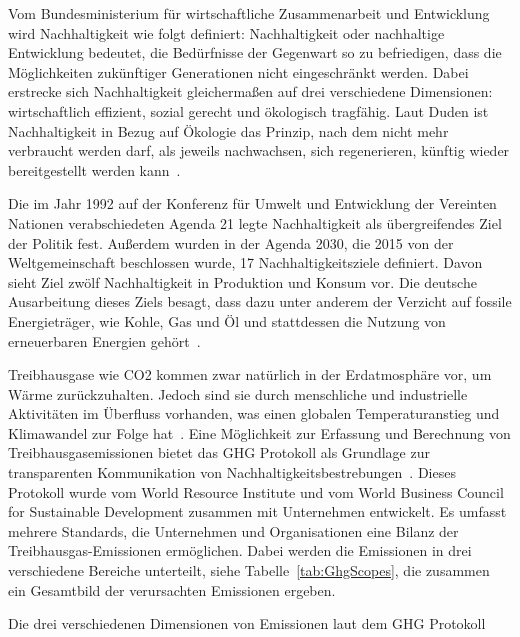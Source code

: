 Vom Bundesministerium für wirtschaftliche Zusammenarbeit und Entwicklung~\cite{BundesministeriumWirtschaftlicheZusammenarbeitundEntwicklung} wird Nachhaltigkeit wie folgt definiert:
\glqq Nachhaltigkeit oder nachhaltige Entwicklung bedeutet, die Bedürfnisse der Gegenwart so zu befriedigen, dass die Möglichkeiten zukünftiger Generationen nicht eingeschränkt werden.\grqq{}
Dabei erstrecke sich Nachhaltigkeit gleichermaßen auf drei verschiedene Dimensionen: wirtschaftlich effizient, sozial gerecht und ökologisch tragfähig.
Laut Duden ist Nachhaltigkeit in Bezug auf Ökologie das \glqq Prinzip, nach dem nicht mehr verbraucht werden darf, als jeweils nachwachsen, sich regenerieren, künftig wieder bereitgestellt werden kann\grqq{}~\cite{Dudenredaktion.27.04.2018}.

Die im Jahr 1992 auf der Konferenz für Umwelt und Entwicklung der Vereinten Nationen verabschiedeten Agenda 21 legte Nachhaltigkeit als übergreifendes Ziel der Politik fest.
Außerdem wurden in der Agenda 2030, die 2015 von der Weltgemeinschaft beschlossen wurde, 17 Nachhaltigkeitsziele definiert.
Davon sieht Ziel zwölf Nachhaltigkeit in Produktion und Konsum vor.
Die deutsche Ausarbeitung dieses Ziels besagt, dass dazu unter anderem der Verzicht auf fossile Energieträger, wie Kohle, Gas und Öl und stattdessen die Nutzung von erneuerbaren Energien gehört~\cite{Bundesregierunginformiert}.

Treibhausgase wie \ac{CO2} kommen zwar natürlich in der Erdatmosphäre vor, um Wärme zurückzuhalten.
Jedoch sind sie durch menschliche und industrielle Aktivitäten im Überfluss vorhanden, was einen globalen Temperaturanstieg und Klimawandel zur Folge hat~\cite{Currie.2024}.
Eine Möglichkeit zur Erfassung und Berechnung von Treibhausgasemissionen bietet das \ac{GHG} Protokoll als Grundlage zur transparenten Kommunikation von Nachhaltigkeitsbestrebungen~\cite{WorldBusinessCouncilforSustainableDevelopment.2004}.
Dieses Protokoll wurde vom World Resource Institute und vom World Business Council for Sustainable Development zusammen mit Unternehmen entwickelt.
Es umfasst mehrere Standards, die Unternehmen und Organisationen eine Bilanz der Treibhausgas-Emissionen ermöglichen.
Dabei werden die Emissionen in drei verschiedene Bereiche unterteilt, siehe Tabelle~\ref{tab:GhgScopes}, die zusammen ein Gesamtbild der verursachten Emissionen ergeben.
\begin{table}[t]
 \centering\small
 \caption[GHG Protokoll Scopes]{Die drei verschiedenen Dimensionen von Emissionen laut dem GHG Protokoll~\cite{WorldBusinessCouncilforSustainableDevelopment.2004}}
 \label{tab:GhgScopes}
 
\end{table}

